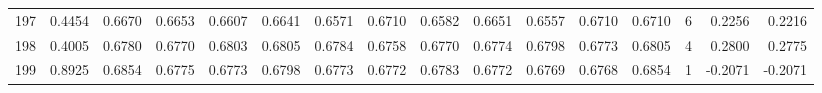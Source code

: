 \begin{tabular}{lrrrrrrrrrrrrrrr}
197 &      0.4454 &  0.6670 &  0.6653 &  0.6607 &  0.6641 &  0.6571 &  0.6710 &  0.6582 &  0.6651 &  0.6557 &   0.6710 &     0.6710 &      6 &                    0.2256 &                     0.2216 \\
198 &      0.4005 &  0.6780 &  0.6770 &  0.6803 &  0.6805 &  0.6784 &  0.6758 &  0.6770 &  0.6774 &  0.6798 &   0.6773 &     0.6805 &      4 &                    0.2800 &                     0.2775 \\
199 &      0.8925 &  0.6854 &  0.6775 &  0.6773 &  0.6798 &  0.6773 &  0.6772 &  0.6783 &  0.6772 &  0.6769 &   0.6768 &     0.6854 &      1 &                   -0.2071 &                    -0.2071 \\
\bottomrule
\end{tabular}
